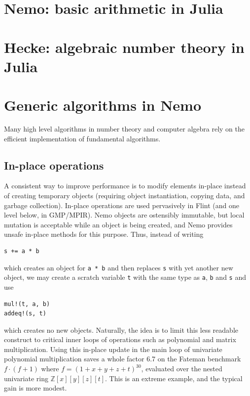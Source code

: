 \documentclass{sig-alternate-05-2015}
\begin{document}
\section{Nemo: basic arithmetic in Julia}

\section{Hecke: algebraic number theory in Julia}

\section{Generic algorithms in Nemo}

Many high level algorithms in number theory and computer algebra rely on
the efficient implementation of fundamental algorithms.

\subsection{In-place operations}

A consistent way to improve performance is to modify
elements in-place instead of creating temporary objects
(requiring object instantiation, copying data, and garbage collection).
In-place operations are used pervasively in Flint (and one level below, in GMP/MPIR).
Nemo objects are ostensibly immutable, but local mutation is
acceptable while an object is being created,
and Nemo provides
unsafe in-place methods for this purpose.
Thus, instead of writing
\begin{verbatim}
s += a * b
\end{verbatim}
which creates an object for \texttt{a * b}
and then replaces \texttt{s} with yet another new object, we may
create a scratch variable \texttt{t} with the same type as \texttt{a}, \texttt{b} and \texttt{s} and use
\begin{verbatim}
mul!(t, a, b)
addeq!(s, t)
\end{verbatim}
which creates no new objects.
Naturally, the idea is to limit this less readable construct to
critical inner loops of operations such as polynomial
and matrix multiplication.
Using this in-place update in the main loop of univariate polynomial
multiplication saves a whole factor 6.7 on the Fateman benchmark
$f \cdot (f+1)$ where
$f = (1 + x + y + z + t)^{30}$, evaluated over the nested univariate
ring $\mathbb{Z}[x][y][z][t]$. This is an extreme example, and
the typical gain is more modest.
\end{document}

